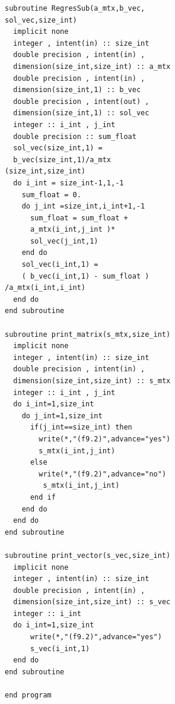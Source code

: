 \documentclass[twocolumn]{article}
\begin{document}
\begin{verbatim}
subroutine RegresSub(a_mtx,b_vec,
sol_vec,size_int)
  implicit none
  integer , intent(in) :: size_int
  double precision , intent(in) , 
  dimension(size_int,size_int) :: a_mtx
  double precision , intent(in) , 
  dimension(size_int,1) :: b_vec
  double precision , intent(out) , 
  dimension(size_int,1) :: sol_vec
  integer :: i_int , j_int
  double precision :: sum_float
  sol_vec(size_int,1) = 
  b_vec(size_int,1)/a_mtx
(size_int,size_int)
  do i_int = size_int-1,1,-1
    sum_float = 0.
    do j_int =size_int,i_int+1,-1
      sum_float = sum_float + 
      a_mtx(i_int,j_int )*
      sol_vec(j_int,1)
    end do
    sol_vec(i_int,1) = 
    ( b_vec(i_int,1) - sum_float )
/a_mtx(i_int,i_int)
  end do
end subroutine

subroutine print_matrix(s_mtx,size_int)
  implicit none
  integer , intent(in) :: size_int
  double precision , intent(in) , 
  dimension(size_int,size_int) :: s_mtx
  integer :: i_int , j_int
  do i_int=1,size_int
    do j_int=1,size_int
      if(j_int==size_int) then
        write(*,"(f9.2)",advance="yes") 
        s_mtx(i_int,j_int)
      else
        write(*,"(f9.2)",advance="no")
         s_mtx(i_int,j_int)
      end if
    end do
  end do 
end subroutine

subroutine print_vector(s_vec,size_int)
  implicit none
  integer , intent(in) :: size_int
  double precision , intent(in) , 
  dimension(size_int,size_int) :: s_vec
  integer :: i_int
  do i_int=1,size_int
      write(*,"(f9.2)",advance="yes")
      s_vec(i_int,1)
  end do 
end subroutine

end program
\end{verbatim}
\end{document}
